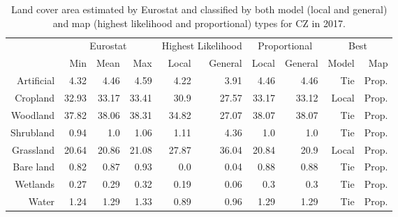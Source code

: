     \begin{table}[H]
    \centering
    \caption{Land cover area estimated by Eurostat and classified by both model (local and general) and map (highest likelihood and proportional) types for CZ in 2017.}
    
    \begin{tabular}{r|rrr|rr|rr|rr}
    \toprule
    {} & \multicolumn{3}{|c}{Eurostat} & \multicolumn{2}{|c}{Highest Likelihood} & \multicolumn{2}{|c}{Proportional} & \multicolumn{2}{|c}{Best} \\
    {} &      Min &   Mean &    Max &              Local & General &        Local & General &  Model &    Map \\
    \midrule
    Artificial &     4.32 &   4.46 &   4.59 &               4.22 &    3.91 &         4.46 &    4.46 &    Tie &  Prop. \\
    Cropland   &    32.93 &  33.17 &  33.41 &               30.9 &   27.57 &        33.17 &   33.12 &  Local &  Prop. \\
    Woodland   &    37.82 &  38.06 &  38.31 &              34.82 &   27.07 &        38.07 &   38.07 &    Tie &  Prop. \\
    Shrubland  &     0.94 &    1.0 &   1.06 &               1.11 &    4.36 &          1.0 &     1.0 &    Tie &  Prop. \\
    Grassland  &    20.64 &  20.86 &  21.08 &              27.87 &   36.04 &        20.84 &    20.9 &  Local &  Prop. \\
    Bare land  &     0.82 &   0.87 &   0.93 &                0.0 &    0.04 &         0.88 &    0.88 &    Tie &  Prop. \\
    Wetlands   &     0.27 &   0.29 &   0.32 &               0.19 &    0.06 &          0.3 &     0.3 &    Tie &  Prop. \\
    Water      &     1.24 &   1.29 &   1.33 &               0.89 &    0.96 &         1.29 &    1.29 &    Tie &  Prop. \\
    \bottomrule
    \end{tabular}
    \end{table}
    
